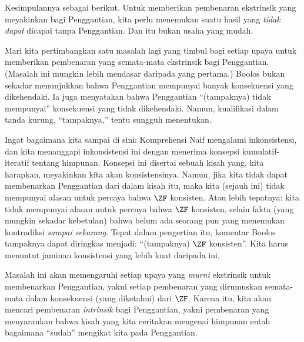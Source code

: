 \documentclass[../../../include/open-logic-section]{subfiles}
\begin{document}
Kesimpulannya sebagai berikut. Untuk memberikan pembenaran ekstrinsik yang
meyakinkan bagi Penggantian, kita perlu menemukan suatu hasil yang
\emph{tidak dapat} dicapai tanpa Penggantian. Dan itu bukan usaha yang mudah.

Mari kita pertimbangkan satu masalah lagi yang timbul bagi setiap upaya untuk
memberikan pembenaran yang semata-mata ekstrinsik bagi Penggantian. (Masalah
ini mungkin lebih mendasar daripada yang pertama.) Boolos bukan sekadar
menunjukkan bahwa Penggantian mempunyai banyak konsekuensi yang dikehendaki.
Ia juga menyatakan bahwa Penggantian ``(tampaknya) tidak mempunyai''
konsekuensi yang tidak dikehendaki. Namun, kualifikasi dalam tanda kurung,
``tampaknya,'' tentu sungguh menentukan.

Ingat bagaimana kita sampai di sini: Komprehensi Naif mengalami
inkonsistensi, dan kita menanggapi inkonsistensi ini dengan menerima
konsepsi kumulatif-iteratif tentang himpunan. Konsepsi ini disertai sebuah
kisah yang, kita harapkan, meyakinkan kita akan konsistensinya. Namun, jika
kita tidak dapat membenarkan Penggantian dari dalam kisah itu, maka kita
(sejauh ini) tidak mempunyai alasan untuk percaya bahwa $\ZF$ konsisten.
Atau lebih tepatnya: kita tidak mempunyai alasan untuk percaya bahwa $\ZF$
konsisten, selain fakta (yang mungkin sekadar kebetulan) bahwa belum ada
seorang pun yang menemukan kontradiksi \emph{sampai sekarang}. Tepat dalam
pengertian itu, komentar Boolos tampaknya dapat diringkas menjadi:
``(tampaknya) $\ZF$ konsisten''. Kita harus menuntut jaminan konsistensi yang
lebih kuat daripada ini.

Masalah ini akan memengaruhi setiap upaya yang \emph{murni} ekstrinsik untuk
membenarkan Penggantian, yakni setiap pembenaran yang dirumuskan semata-mata
dalam konsekuensi (yang diketahui) dari $\ZF$. Karena itu, kita akan mencari
pembenaran \emph{intrinsik} bagi Penggantian, yakni pembenaran yang
menyarankan bahwa kisah yang kita ceritakan mengenai himpunan entah bagaimana
``sudah'' mengikat kita pada Penggantian.
\end{document}
